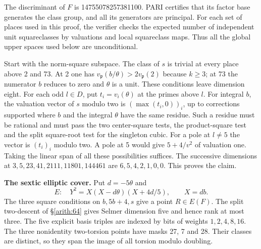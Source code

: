 The discriminant of \(F\) is 14755078257381100. PARI certifies that its
factor base generates the class group, and all its generators are
principal. For each set of places used in this proof, the verifier
checks the expected number of independent unit squareclasses by
valuations and local squareclass maps. Thus all the global upper
spaces used below are unconditional.

Start with the norm-square subspace. The class of \(s\) is trivial at
every place above 2 and 73. At 2 one has
\(v_{\mathfrak p}(b/\theta)>2v_{\mathfrak p}(2)\) because \(k\ge3\);
at 73 the numerator \(b\) reduces to zero and \(\theta\) is a unit.
These conditions leave dimension eight. For each odd \(l\in D\), put
\(t_i=v_i(\theta)\) at the primes above \(l\). For integral \(b\), the
valuation vector of \(s\) modulo two is \((\max(t_i,0))_i\), up to
corrections supported where \(b\) and the integral \(\theta\) have the
same residue. Such a residue must be rational and must pass the two
center-square tests, the product-square test and the split square-root
test for the singleton cubic. For a pole at \(l\ne5\) the vector is
\((t_i)_i\) modulo two. A pole at 5 would give \(5+4/v^2\) of valuation one.
Taking the linear span of all these possibilities suffices. The
successive dimensions at \(3,5,23,41,2111,11801,144461\) are
\(6,5,4,2,1,0,0\). This proves the claim.

\textbf{The sextic elliptic cover.} Put \(d=-5\theta\) and
\[E:\quad Y^2=X(X-d\theta)(X+4d/5),\qquad X=db .\]
The three square conditions on \(b,5b+4,s\) give a point \(R\in E(F)\).
The split two-descent of \S\ref{arith:64} gives Selmer dimension five and hence
rank at most three. The five explicit basis triples are indexed by bits
of weights \(1,2,4,8,16\). The three nonidentity two-torsion points have
masks 27, 7 and 28. Their classes are distinct, so they span the image
of all torsion modulo doubling.

